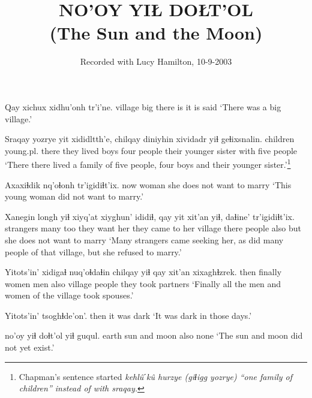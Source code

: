 \documentclass[12pt]{article}
\begin{document}
\title{NO'OY YIŁ DOŁT'OL \\(The Sun and the Moon)}

\author{Recorded with Lucy Hamilton, 10-9-2003}
\date{}

\maketitle


\gll Qay xichux xidhu'onh tr'i'ne.
village big  {there is} {it is said}
\glt `There was a big village.'
\glend

\gll Sraqay yozrye yit xididltth'e,  chilqay diniyhin xividadr  yiɬ geɬixsnalin.
children young.pl. there {they lived} boys {four people} {their younger sister} with {five people}
\glt `There there lived a family of five people, four boys and their younger sister.'\footnote{Chapman's sentence started \em kehl\^uˊk\^u hurzye (giɬigg yozrye) \em ``one family of children'' instead of with \em sraqay.}
\glend

\gll Axaxiɬdik nq'oɬonh tr'igidiɬt'ix.
now  woman  {she does not want to marry}
\glt `This young woman did not want to marry.'
\glend

\gll Xanegin longh yiɬ xiyq'at {xiyghun' ididiɬ,} qay yit xit'an yiɬ, daɬine' tr'igidiɬt'ix.
strangers many too {they want her} {they came to her} village there people also but {she does not want to marry}
\glt `Many strangers came seeking her, as did many people of that village, but she refused to marry.'
\glend

\gll Yitots'in' xidigaɬ nuq'oɬdaɬin chilqay yiɬ qay xit'an  xixaghɬzrek.
then  finally  women men also village people  {they took partners}
\glt `Finally all the men and women of the village took spouses.'
\glend

\gll Yitots'in' tsoghɬde'on'.
then  {it was dark}
\glt `It was dark in those days.'
\glend

 no'oy yiɬ doɬt'ol yiɬ guqul.
earth  sun and moon also none
\glt `The sun and moon did not yet exist.'
\glend
\end{document}

